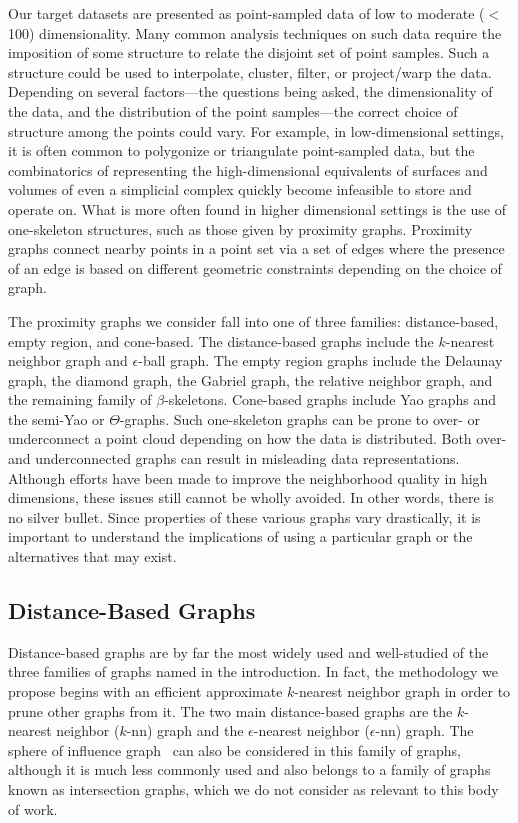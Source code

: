 Our target datasets are presented as point-sampled data of low to moderate ($<$100) dimensionality.
%
Many common analysis techniques on such data require the imposition of some structure to relate the disjoint set of point samples.
%
Such a structure could be used to interpolate, cluster, filter, or project/warp the data.
%
Depending on several factors---the questions being asked, the dimensionality of the data, and the distribution of the point samples---the correct choice of structure among the points could vary.
%
For example, in low-dimensional settings, it is often common to polygonize or triangulate point-sampled data, but the combinatorics of representing the high-dimensional equivalents of surfaces and volumes of even a simplicial complex quickly become infeasible to store and operate on.
%
What is more often found in higher dimensional settings is the use of one-skeleton structures, such as those given by proximity graphs.
%
Proximity graphs connect nearby points in a point set via a set of edges where the presence of an edge is based on different geometric constraints depending on the choice of graph.

The proximity graphs we consider fall into one of three families: distance-based, empty region, and cone-based.
%
The distance-based graphs include the $k$-nearest neighbor graph and $\epsilon$-ball graph.
%
The empty region graphs include the Delaunay graph, the diamond graph, the Gabriel graph, the relative neighbor graph, and the remaining family of $\beta$-skeletons.
%
Cone-based graphs include Yao graphs and the semi-Yao or $\Theta$-graphs.
%
Such one-skeleton graphs can be prone to over- or underconnect a point cloud depending on how the data is distributed.
%
Both over- and underconnected graphs can result in misleading data representations.
%
Although efforts have been made to improve the neighborhood quality in high dimensions, these issues still cannot be wholly avoided.
%
In other words, there is no silver bullet.
%
Since properties of these various graphs vary drastically, it is important to understand the implications of using a particular graph or the alternatives that may exist.

\subsection{Distance-Based Graphs}
Distance-based graphs are by far the most widely used and well-studied of the three families of graphs named in the introduction.
%
In fact, the methodology we propose begins with an efficient approximate $k$-nearest neighbor graph in order to prune other graphs from it.
%
The two main distance-based graphs are the $k$-nearest neighbor ($k$-nn) graph and the $\epsilon$-nearest neighbor ($\epsilon$-nn) graph.
%
The sphere of influence graph~\cite{Toussaint1988} can also be considered in this family of graphs, although it is much less commonly used and also belongs to a family of graphs known as intersection graphs, which we do not consider as relevant to this body of work.

